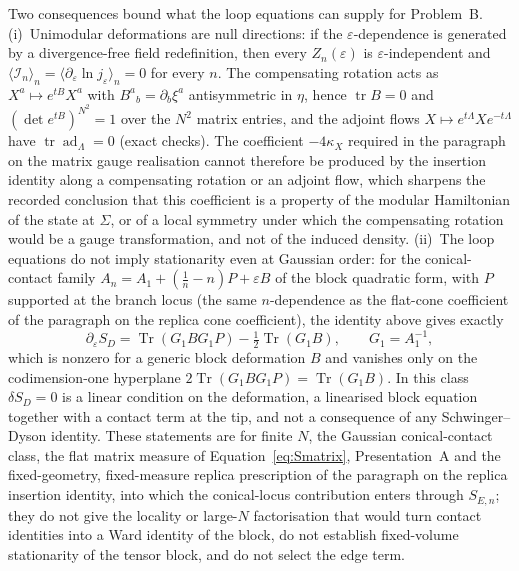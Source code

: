 Two consequences bound what the loop equations can supply for Problem~B. (i)~Unimodular deformations are null directions: if the \(\varepsilon\)-dependence is generated by a divergence-free field redefinition, then every \(Z_n(\varepsilon)\) is \(\varepsilon\)-independent and \(\langle\mathcal I_n\rangle_n=\langle\partial_\varepsilon\ln j_\varepsilon\rangle_n=0\) for every \(n\). The compensating rotation acts as \(X^a\mapsto e^{tB}X^a\) with \(B^a{}_b=\partial_b\xi^a\) antisymmetric in \(\eta\), hence \(\operatorname{tr}B=0\) and \((\det e^{tB})^{N^2}=1\) over the \(N^2\) matrix entries, and the adjoint flows \(X\mapsto e^{t\Lambda}Xe^{-t\Lambda}\) have \(\operatorname{tr}\operatorname{ad}_\Lambda=0\) (exact checks). The coefficient \(-4\kappa_X\) required in the paragraph on the matrix gauge realisation cannot therefore be produced by the insertion identity along a compensating rotation or an adjoint flow, which sharpens the recorded conclusion that this coefficient is a property of the modular Hamiltonian of the state at \(\Sigma\), or of a local symmetry under which the compensating rotation would be a gauge transformation, and not of the induced density. (ii)~The loop equations do not imply stationarity even at Gaussian order: for the conical-contact family \(A_n=A_1+(\tfrac1n-n)P+\varepsilon B\) of the block quadratic form, with \(P\) supported at the branch locus (the same \(n\)-dependence as the flat-cone coefficient of the paragraph on the replica cone coefficient), the identity above gives exactly
\[
  \partial_\varepsilon S_D=\operatorname{Tr}(G_1BG_1P)-\tfrac12\operatorname{Tr}(G_1B),\qquad G_1=A_1^{-1},
\]
which is nonzero for a generic block deformation \(B\) and vanishes only on the codimension-one hyperplane \(2\operatorname{Tr}(G_1BG_1P)=\operatorname{Tr}(G_1B)\). In this class \(\delta S_D=0\) is a linear condition on the deformation, a linearised block equation together with a contact term at the tip, and not a consequence of any Schwinger--Dyson identity. These statements are for finite \(N\), the Gaussian conical-contact class, the flat matrix measure of Equation~\eqref{eq:Smatrix}, Presentation~A and the fixed-geometry, fixed-measure replica prescription of the paragraph on the replica insertion identity, into which the conical-locus contribution enters through \(S_{E,n}\); they do not give the locality or large-\(N\) factorisation that would turn contact identities into a Ward identity of the block, do not establish fixed-volume stationarity of the tensor block, and do not select the edge term.

